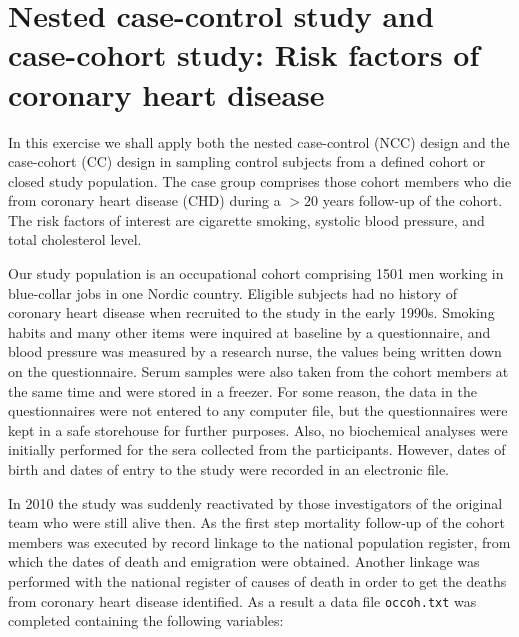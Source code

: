 \documentclass[
]{book}
\theoremstyle{definition}
\theoremstyle{definition}
\theoremstyle{definition}
\theoremstyle{definition}
\theoremstyle{remark}
\begin{document}
\chapter{Nested case-control study and case-cohort study: Risk factors of coronary heart disease}\label{nested-case-control-study-and-case-cohort-study-risk-factors-of-coronary-heart-disease}

In this exercise we shall apply both the nested case-control (NCC)
design and the case-cohort (CC) design in sampling
control subjects from a defined cohort or closed study population.
The case group comprises those cohort members who die from coronary heart disease (CHD) during a \(> 20\) years follow-up of the cohort.\\
The risk factors of interest are cigarette smoking, systolic blood pressure, and total cholesterol level.

Our study population is an occupational cohort comprising 1501 men
working in blue-collar jobs in one Nordic country.
Eligible subjects had no history of coronary heart disease
when recruited to the study in the early 1990s.
Smoking habits and many other items were inquired at baseline
by a questionnaire, and
blood pressure was measured by a research nurse, the values being
written down on the questionnaire. Serum samples were also taken from the cohort members at the same time and were stored in a freezer. For some reason,
the data in the questionnaires were not entered to any computer file, but the questionnaires were kept in a safe storehouse for further purposes.
Also, no biochemical analyses were initially performed for the sera
collected from the participants. However, dates of birth and dates of entry to the study were recorded
in an electronic file.

In 2010 the study was suddenly reactivated by those investigators of the original team who were still alive then.
As the first step mortality follow-up of the cohort members was
executed by record linkage to the national population register, from which
the dates of death and emigration were obtained. Another linkage was performed with the national register of causes of death in order to get the
deaths from coronary heart disease identified. As a result a data file
\texttt{occoh.txt} was completed containing the following variables:
\end{document}
